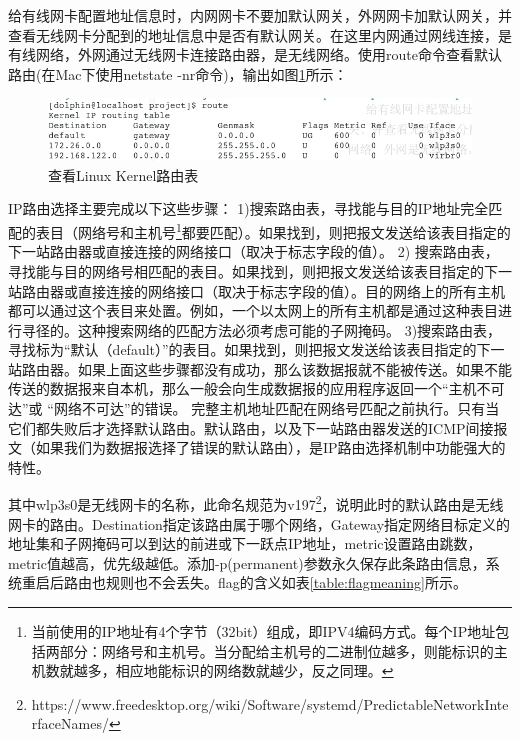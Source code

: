 \documentclass[12pt]{book}
\numberwithin{dummy}{section}
\theoremstyle{ocrenumbox}
\theoremstyle{blacknumex}
\theoremstyle{blacknumbox}
\theoremstyle{ocrenum}
\begin{document}
给有线网卡配置地址信息时，内网网卡不要加默认网关，外网网卡加默认网关，并查看无线网卡分配到的地址信息中是否有默认网关。在这里内网通过网线连接，是有线网络，外网通过无线网卡连接路由器，是无线网络。使用route命令查看默认路由(在Mac下使用netstate -nr命令)，输出如图\ref{fig:routetable}所示：

\begin{figure}[htbp]
	\centering
	\includegraphics[scale=0.5]{route-table.jpg}
	\caption{查看Linux Kernel路由表}
	\label{fig:routetable}
\end{figure}

IP路由选择主要完成以下这些步骤：
1)搜索路由表，寻找能与目的IP地址完全匹配的表目（网络号和主机号\footnote{当前使用的IP地址有4个字节（32bit）组成，即IPV4编码方式。每个IP地址包括两部分：网络号和主机号。当分配给主机号的二进制位越多，则能标识的主机数就越多，相应地能标识的网络数就越少，反之同理。}都要匹配）。如果找到，则把报文发送给该表目指定的下一站路由器或直接连接的网络接口（取决于标志字段的值）。
2) 搜索路由表，寻找能与目的网络号相匹配的表目。如果找到，则把报文发送给该表目指定的下一站路由器或直接连接的网络接口（取决于标志字段的值）。目的网络上的所有主机都可以通过这个表目来处置。例如，一个以太网上的所有主机都是通过这种表目进行寻径的。这种搜索网络的匹配方法必须考虑可能的子网掩码。
3)搜索路由表，寻找标为“默认（default）”的表目。如果找到，则把报文发送给该表目指定的下一站路由器。如果上面这些步骤都没有成功，那么该数据报就不能被传送。如果不能传送的数据报来自本机，那么一般会向生成数据报的应用程序返回一个“主机不可达”或 “网络不可达”的错误。
完整主机地址匹配在网络号匹配之前执行。只有当它们都失败后才选择默认路由。默认路由，以及下一站路由器发送的ICMP间接报文（如果我们为数据报选择了错误的默认路由），是IP路由选择机制中功能强大的特性。

其中wlp3s0是无线网卡的名称，此命名规范为v197\footnote{https://www.freedesktop.org/wiki/Software/systemd/PredictableNetworkInterfaceNames/}，说明此时的默认路由是无线网卡的路由。Destination指定该路由属于哪个网络，Gateway指定网络目标定义的地址集和子网掩码可以到达的前进或下一跃点IP地址，metric设置路由跳数，metric值越高，优先级越低。添加-p(permanent)参数永久保存此条路由信息，系统重启后路由也规则也不会丢失。flag的含义如表\ref{table:flagmeaning}所示。
\end{document}
